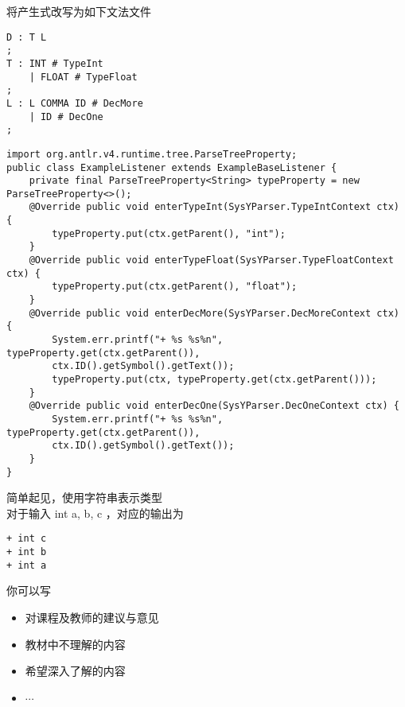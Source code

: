 \documentclass[a4paper, justified]{tufte-handout}
\begin{document}
\begin{solution}
	将产生式改写为如下文法文件
	\begin{lstlisting}
D : T L
;
T : INT # TypeInt
	| FLOAT # TypeFloat
;
L : L COMMA ID # DecMore
	| ID # DecOne
;
	\end{lstlisting}
	\begin{lstlisting}
import org.antlr.v4.runtime.tree.ParseTreeProperty;
public class ExampleListener extends ExampleBaseListener {
	private final ParseTreeProperty<String> typeProperty = new ParseTreeProperty<>();
	@Override public void enterTypeInt(SysYParser.TypeIntContext ctx) {
		typeProperty.put(ctx.getParent(), "int");
	}
	@Override public void enterTypeFloat(SysYParser.TypeFloatContext ctx) {
		typeProperty.put(ctx.getParent(), "float");
	}
	@Override public void enterDecMore(SysYParser.DecMoreContext ctx) {
		System.err.printf("+ %s %s%n", typeProperty.get(ctx.getParent()),
		ctx.ID().getSymbol().getText());
		typeProperty.put(ctx, typeProperty.get(ctx.getParent()));
	}
	@Override public void enterDecOne(SysYParser.DecOneContext ctx) {
		System.err.printf("+ %s %s%n", typeProperty.get(ctx.getParent()),
		ctx.ID().getSymbol().getText());
	}
}
	\end{lstlisting}
	简单起见，使用字符串表示类型\\
	对于输入 int a, b, c ，对应的输出为
	\begin{lstlisting}
+ int c
+ int b
+ int a
	\end{lstlisting}
\end{solution}



\beginfb

你可以写
\begin{itemize}
  \item 对课程及教师的建议与意见
  \item 教材中不理解的内容
  \item 希望深入了解的内容
  \item $\cdots$
\end{itemize}
\end{document}
